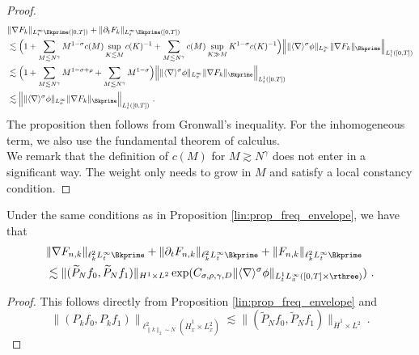 \documentclass[11pt]{article}
\begin{document}
\begin{proof}
\begin{align*}
&\| \nabla F_k \|_{L_t^\infty \Bkprime([0,T])}+ \| \partial_t F_k \|_{L_t^\infty \Bkprime([0,T])} \\
&\lesssim \Big( 1+ \sum_{M\lesssim N^\gamma} M^{1-\sigma} c(M) \sup_{K\lesssim M} c(K)^{-1} + \sum_{M\lesssim N^\gamma} c(M) \sup_{K\gg M} K^{1-\sigma} c(K)^{-1} \Big)   \Big \| \| \langle \nabla \rangle^\sigma \phi \|_{L_x^\infty} \| \nabla F_k \|_{\Bkprime} \Big \|_{L_t^1([0,T])} \\
&\lesssim \Big( 1+ \sum_{M\lesssim N^\gamma} M^{1-\sigma+\rho} + \sum_{M\lesssim N^\gamma} M^{1-\sigma} \Big)   \Big \| \| \langle \nabla \rangle^\sigma \phi \|_{L_x^\infty} \| \nabla F_k \|_{\Bkprime} \Big \|_{L_t^1([0,T])}\\
&\lesssim   \Big \| \| \langle \nabla \rangle^\sigma \phi \|_{L_x^\infty} \| \nabla F_k \|_{\Bkprime} \Big \|_{L_t^1([0,T])}~.
\end{align*}
The proposition then follows from Gronwall's inequality. For the inhomogeneous term, we also use the fundamental theorem of calculus.\\
We remark that the definition of \( c(M) \) for \( M \gtrsim N^\gamma \) does not enter in a significant way. The weight only needs to grow in  \( M \) and satisfy a local constancy condition.
\end{proof}
\begin{cor} Under the same conditions as in Proposition \ref{lin:prop_freq_envelope}, we have that
\begin{equation*}
\begin{aligned}
&\| \nabla F_{n,k} \|_{\ell_k^2 L_t^\infty \Bkprime} + \| \partial_t F_{n,k} \|_{\ell_k^2 L_t^\infty \Bkprime}+ \|  F_{n,k} \|_{\ell_k^2 L_t^\infty \Bkprime}\\
& \lesssim \| (\widetilde{P}_N f_0, \widetilde{P}_N f_1) \|_{H^1\times L^2}  \exp( C_{\sigma,\rho,\gamma,D} \| \langle \nabla \rangle^{\sigma}  \phi \|_{L_t^1 L_x^\infty([0,T]\times \rthree)} )~. 
\end{aligned}
\end{equation*}
\end{cor}
\begin{proof}
This follows directly from Proposition \ref{lin:prop_freq_envelope} and \begin{equation*}
\| (P_k f_0, P_k f_1) \|_{\ell_{\| k\|_2 \sim N}^2 ( \dot{H}_x^1 \times L_x^2)} \lesssim \| (\widetilde{P}_N f_0, \widetilde{P}_N f_1) \|_{\dot{H}^1\times L^2}~. 
\end{equation*}
\end{proof}
\end{document}
